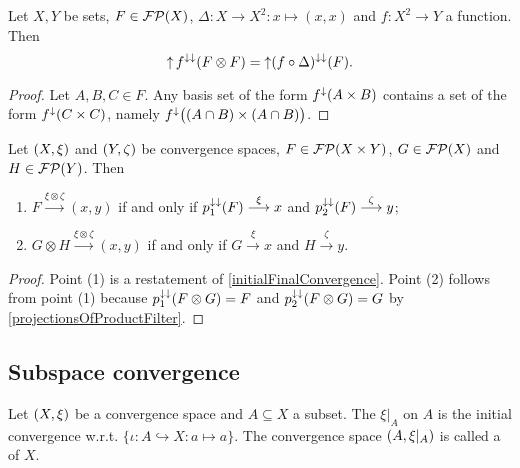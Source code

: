 \begin{lemma} \label{filterPairingLemma}
Let $X,Y$ be sets, $F\in\operatorname{\mathcal{FP}}(X)$, $\Delta: X\to X^2: x\mapsto (x,x)$ and $f: X^2\to Y$ a function. Then
\[ \operatorname{\uparrow} f^{\downarrow\downarrow}(F\otimes F) = \operatorname{\uparrow} (f\circ \Delta)^{\downarrow\downarrow}(F). \]
\end{lemma}
\begin{proof}
Let $A,B,C\in F$. Any basis set of the form $f^{\downarrow}(A\times B)$ contains a set of the form $f^\downarrow(C\times C)$, namely $f^{\downarrow}\big((A\cap B)\times (A\cap B)\big)$.
\end{proof}

\begin{lemma} \label{convergenceFiniteProductFilter}
Let $\left( X,\xi \right)$ and $\left( Y,\zeta \right)$ be convergence spaces, $F\in \operatorname{\mathcal{FP}}(X\times Y)$, $G\in \operatorname{\mathcal{FP}}(X)$ and $H\in \operatorname{\mathcal{FP}}(Y)$. Then
\begin{enumerate}
\item $F \overset{\xi \otimes \zeta}{\longrightarrow} (x,y)$ \textup{if and only if} $p_1^{\downarrow\downarrow}(F) \overset{\xi}{\longrightarrow} x$ and $p_2^{\downarrow\downarrow}(F) \overset{\zeta}{\longrightarrow} y$;
\item $G\otimes H \overset{\xi \otimes \zeta}{\longrightarrow} (x,y)$ \textup{if and only if} $G \overset{\xi}{\longrightarrow} x$ and $H \overset{\zeta}{\longrightarrow} y$.
\end{enumerate}
\end{lemma}
\begin{proof}
Point (1) is a restatement of \ref{initialFinalConvergence}. Point (2) follows from point (1) because $p_1^{\downarrow\downarrow}(F\otimes G) = F$ and $p_2^{\downarrow\downarrow}(F\otimes G) = G$ by \ref{projectionsOfProductFilter}.
\end{proof}


\subsection{Subspace convergence}
\begin{definition}
Let $\left( X,\xi \right)$ be a convergence space and $A\subseteq X$ a subset. The  $\xi|_A$ on $A$ is the initial convergence w.r.t. $\{\iota: A \hookrightarrow X: a\mapsto a\}$. The convergence space $\left( A,\xi|_A \right)$ is called a  of $X$.
\end{definition}

